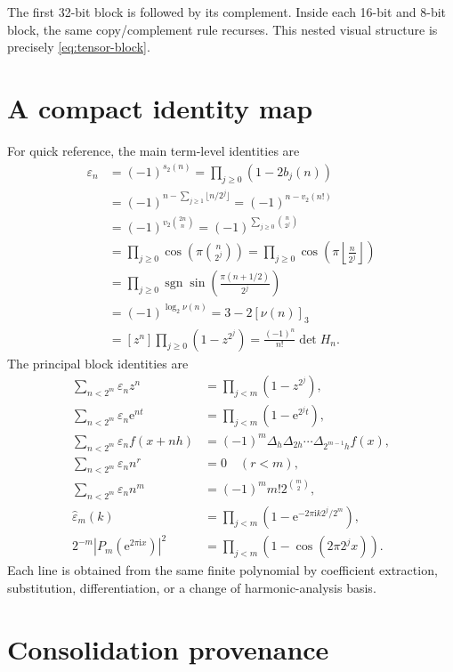 \documentclass[11pt,oneside]{article}
\theoremstyle{definition}
\theoremstyle{remark}
\newcommand{\e}{\mathrm e}
\newcommand{\ii}{\mathrm i}
\newcommand{\wt}{s_2}
\newcommand{\vtwo}{v_2}
\newcommand{\eps}{\varepsilon}
\newcommand{\sgn}{\operatorname{sgn}}
\newcommand{\res}[2]{\left[#1\right]_{#2}}
\begin{document}
The first 32-bit block is followed by its complement.  Inside each 16-bit and 8-bit block,
the same copy/complement rule recurses.  This nested visual structure is precisely
\eqref{eq:tensor-block}.

\section{A compact identity map}
\label{app:identity-map}

For quick reference, the main term-level identities are
\begin{align*}
  \eps_n
  &=(-1)^{\wt(n)}
   =\prod_{j\ge0}(1-2b_j(n))\\
  &=(-1)^{n-\sum_{j\ge1}\lfloor n/2^j\rfloor}
   =(-1)^{n-\vtwo(n!)}\\
  &=(-1)^{\vtwo\binom{2n}{n}}
   =(-1)^{\sum_{j\ge0}\binom{n}{2^j}}\\
  &=\prod_{j\ge0}\cos\!\left(\pi\binom{n}{2^j}\right)
   =\prod_{j\ge0}\cos\!\left(\pi\left\lfloor\frac n{2^j}\right\rfloor\right)\\
  &=\prod_{j\ge0}\sgn\!\sin\!\left(\frac{\pi(n+1/2)}{2^j}\right)\\
  &=(-1)^{\log_2\nu(n)}
   =3-2\res{\nu(n)}3\\
  &=[z^n]\prod_{j\ge0}(1-z^{2^j})
   =\frac{(-1)^n}{n!}\det H_n.
\end{align*}
The principal block identities are
\begin{align*}
  \sum_{n<2^m}\eps_nz^n
   &=\prod_{j<m}(1-z^{2^j}),\\
  \sum_{n<2^m}\eps_n\e^{nt}
   &=\prod_{j<m}(1-\e^{2^jt}),\\
  \sum_{n<2^m}\eps_nf(x+nh)
   &=(-1)^m\Delta_h\Delta_{2h}\cdots\Delta_{2^{m-1}h}f(x),\\
  \sum_{n<2^m}\eps_nn^r&=0\quad(r<m),\\
  \sum_{n<2^m}\eps_nn^m&=(-1)^mm!2^{\binom m2},\\
  \widehat\eps_m(k)&=\prod_{j<m}
     (1-\e^{-2\pi\ii k2^j/2^m}),\\
  2^{-m}|P_m(\e^{2\pi\ii x})|^2
   &=\prod_{j<m}(1-\cos(2\pi2^jx)).
\end{align*}
Each line is obtained from the same finite polynomial by coefficient extraction,
substitution, differentiation, or a change of harmonic-analysis basis.

\section{Consolidation provenance}
\label{app:provenance}
\end{document}
